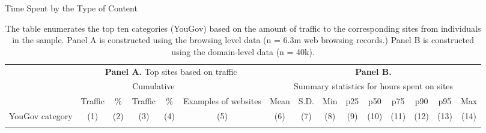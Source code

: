 \documentclass[12pt,twoside]{article}
\begin{document}
\begin{landscape}%
    \begin{table}[ht] \centering \small \setlength\tabcolsep{3 pt} \setlength{\defaultaddspace}{0pt}
    \def\sym#1{\ifmmode^{#1}\else\(^{#1}\)\fi}
    \caption{Time Spent by the Type of Content}
    \label{tab:top10cat_description}
	\begin{adjustbox}{max width=1.325\textwidth}
            \begin{tabular}{@{\hspace{0\tabcolsep}}lrrrrrrrrrrrrrr@{\hspace{0\tabcolsep}}}
            \toprule\toprule
            &\multicolumn{5}{c}{\textbf{Panel A.} Top sites based on traffic}&\multicolumn{9}{c}{\textbf{Panel B.}}\\
            \cmidrule(lr){2-6}
            &&&\multicolumn{2}{c}{Cumulative}&&\multicolumn{9}{c}{Summary statistics for hours spent on sites}\\
            \cmidrule(l){4-5}\cmidrule{7-15}
            &\multicolumn{1}{c}{Traffic}&\multicolumn{1}{c}{\%}&\multicolumn{1}{c}{Traffic}&\multicolumn{1}{c}{\%}&\multicolumn{1}{c}{Examples of websites}&\multicolumn{1}{c}{Mean}&\multicolumn{1}{c}{S.D.}&\multicolumn{1}{c}{Min}&\multicolumn{1}{c}{p25}&\multicolumn{1}{c}{p50}&\multicolumn{1}{c}{p75}&\multicolumn{1}{c}{p90}&\multicolumn{1}{c}{p95}&\multicolumn{1}{c}{Max}\\
            \cmidrule(l){2-5}
            YouGov category&\multicolumn{1}{c}{(1)}&\multicolumn{1}{c}{(2)}&\multicolumn{1}{c}{(3)}&\multicolumn{1}{c}{(4)}&\multicolumn{1}{c}{(5)}&\multicolumn{1}{c}{(6)}&\multicolumn{1}{c}{(7)}&\multicolumn{1}{c}{(8)}&\multicolumn{1}{c}{(9)}&\multicolumn{1}{c}{(10)}&\multicolumn{1}{c}{(11)}&\multicolumn{1}{c}{(12)}&\multicolumn{1}{c}{(13)}&\multicolumn{1}{c}{(14)} \\
            \midrule
            \\       
            \bottomrule
        \end{tabular}
        \end{adjustbox}
        \caption*{\scriptsize
        The table enumerates the top ten categories (YouGov) based on the amount of traffic to the corresponding sites from individuals in the sample.
        Panel A is constructed using the browsing level data (n = 6.3m web browsing records.) Panel B is constructed using the domain-level data (n = 40k).
        }
    \end{table}
\end{landscape}
\end{document}
